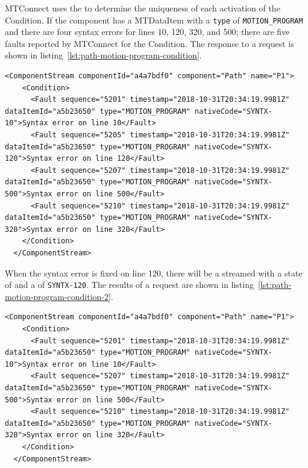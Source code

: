 MTConnect uses the  to determine the uniqueness of each activation of the Condition. If the  component has a \gls{MTDataItem} with a \texttt{type} of \texttt{MOTION_PROGRAM} and there are four syntax errors for lines 10, 120, 320, and 500; there are five faults reported by MTConnect for the Condition. The response to a  request is shown in listing~\ref{lst:path-motion-program-condition}.

\begin{lstlisting}[firstnumber=last,escapechar=|,%
    caption={Path Motion Program Syntax Errors},label={lst:path-motion-program-condition}]
  <ComponentStream componentId="a4a7bdf0" component="Path" name="P1">
    <Condition>
      <Fault sequence="5201" timestamp="2018-10-31T20:34:19.9981Z" dataItemId="a5b23650" type="MOTION_PROGRAM" nativeCode="SYNTX-10">Syntax error on line 10</Fault>
      <Fault sequence="5205" timestamp="2018-10-31T20:34:19.9981Z" dataItemId="a5b23650" type="MOTION_PROGRAM" nativeCode="SYNTX-120">Syntax error on line 120</Fault>
      <Fault sequence="5207" timestamp="2018-10-31T20:34:19.9981Z" dataItemId="a5b23650" type="MOTION_PROGRAM" nativeCode="SYNTX-500">Syntax error on line 500</Fault>
      <Fault sequence="5210" timestamp="2018-10-31T20:34:19.9981Z" dataItemId="a5b23650" type="MOTION_PROGRAM" nativeCode="SYNTX-320">Syntax error on line 320</Fault>
    </Condition>
  </ComponentStream>
\end{lstlisting}

When the syntax error is fixed on line 120, there will be a  streamed with a state of  and a  of \texttt{SYNTX-120}. The results of a  request are shown in listing~\ref{lst:path-motion-program-condition-2}.

\begin{lstlisting}[firstnumber=last,escapechar=|,%
    caption={Path Motion Program Clearing Syntax Error on Line 120},label={lst:path-motion-program-condition-2}]
  <ComponentStream componentId="a4a7bdf0" component="Path" name="P1">
    <Condition>
      <Fault sequence="5201" timestamp="2018-10-31T20:34:19.9981Z" dataItemId="a5b23650" type="MOTION_PROGRAM" nativeCode="SYNTX-10">Syntax error on line 10</Fault>
      <Fault sequence="5207" timestamp="2018-10-31T20:34:19.9981Z" dataItemId="a5b23650" type="MOTION_PROGRAM" nativeCode="SYNTX-500">Syntax error on line 500</Fault>
      <Fault sequence="5210" timestamp="2018-10-31T20:34:19.9981Z" dataItemId="a5b23650" type="MOTION_PROGRAM" nativeCode="SYNTX-320">Syntax error on line 320</Fault>
    </Condition>
  </ComponentStream>
\end{lstlisting}

